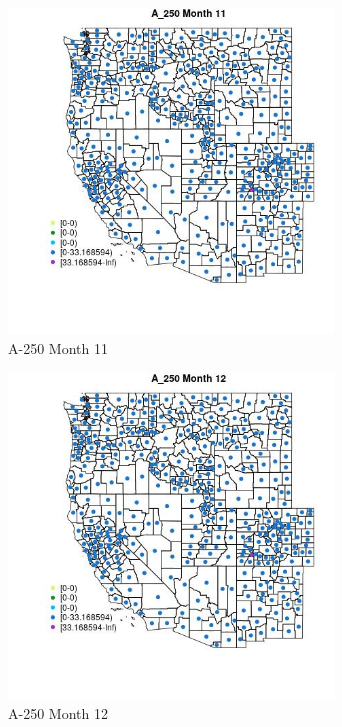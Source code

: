\begin{figure} 
\centering  
\includegraphics[width=0.77\textwidth]{Code_Outputs/df_report_ML_predictors_CountyCentroid_Locations_Dates_2008-01-01to2018-12-31_MapObsMo11A_250.jpg} 
\caption{\label{fig:df_report_ML_predictors_CountyCentroid_Locations_Dates_2008-01-01to2018-12-31MapObsMo11A_250}A-250 Month 11} 
\end{figure} 
 

\begin{figure} 
\centering  
\includegraphics[width=0.77\textwidth]{Code_Outputs/df_report_ML_predictors_CountyCentroid_Locations_Dates_2008-01-01to2018-12-31_MapObsMo12A_250.jpg} 
\caption{\label{fig:df_report_ML_predictors_CountyCentroid_Locations_Dates_2008-01-01to2018-12-31MapObsMo12A_250}A-250 Month 12} 
\end{figure} 
 

